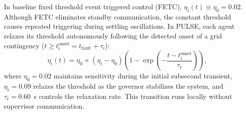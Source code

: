 \documentclass[preprint,12pt]{elsarticle}
\begin{document}
In baseline fixed threshold event triggered control (FETC), $\eta_i(t) \equiv \eta_0 = 0.02$. Although FETC eliminates standby communication, the constant threshold causes repeated triggering during settling oscillations. In PULSE, each agent relaxes its threshold autonomously following the detected onset of a grid contingency ($t \ge t_i^{\mathrm{onset}} = t_{\mathrm{fault}} + \tau_i$):
\begin{equation}
\eta_i(t) = \eta_0 + (\eta_{\mathrm{r}} - \eta_0)\left(1 - \exp\left(-\frac{t - t_i^{\mathrm{onset}}}{\tau_{\mathrm{r}}}\right)\right),
\label{eq:adaptive}
\end{equation}
where $\eta_0 = 0.02$ maintains sensitivity during the initial subsecond transient, $\eta_{\mathrm{r}} = 0.09$ relaxes the threshold as the governor stabilizes the system, and $\tau_{\mathrm{r}} = 0.60$~s controls the relaxation rate. This transition runs locally without supervisor communication.
\end{document}
